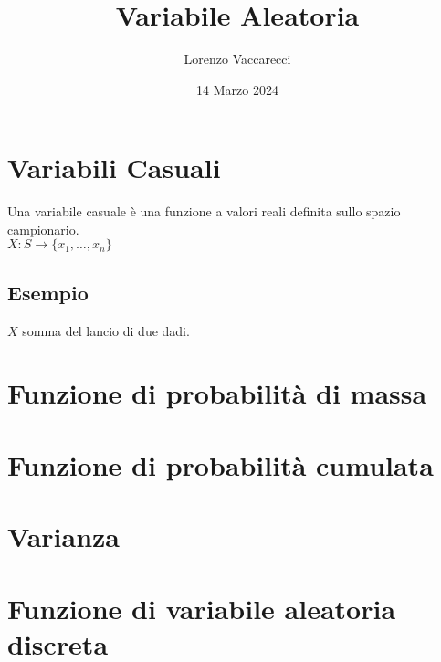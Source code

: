\documentclass[12pt]{article}
\title{Variabile Aleatoria}
\author{Lorenzo Vaccarecci}
\date{14 Marzo 2024}
\begin{document}
\maketitle
\section{Variabili Casuali}
Una variabile casuale è una funzione a valori reali definita sullo spazio campionario.\\
\(X: S \rightarrow \{x_{1}, \dots, x_{n}\}\)
\subsection{Esempio}
$X$ somma del lancio di due dadi.
\section{Funzione di probabilità di massa}

\section{Funzione di probabilità cumulata}
\section{Varianza}
\section{Funzione di variabile aleatoria discreta}
\end{document}
